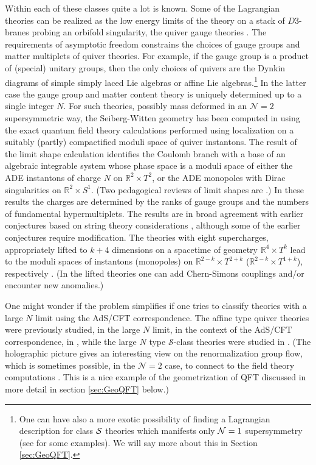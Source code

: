 \documentclass[12pt]{article}
\newcommand\BR{\mathbb{R}}
\newcommand\CalN{\mathcal{N}}
\newcommand\CalS{\mathcal{S}}
\begin{document}
Within each of these classes quite a lot is known. 
Some of the Lagrangian theories can be realized as the low energy limits of the theory on a stack of $D3$-branes probing an orbifold singularity, the quiver gauge theories \cite{Douglas:1996sw}. The requirements of asymptotic freedom constrains the choices of gauge groups
and matter multiplets of quiver theories. For example, if the gauge group is a product of (special) unitary groups, then the only choices
of quivers are the Dynkin diagrams of simple simply laced Lie algebras or affine Lie algebras.\footnote{ One can have also a more exotic possibility of finding a Lagrangian description for class ${\cal S}$ theories which manifests only ${\cal N}=1$ supersymmetry (see \cite{Maruyoshi:2016aim,Razamat:2019vfd,Zafrir:2019hps} for some examples). We will say more about this in Section \ref{sec:GeoQFT}. } In the latter case the gauge group and matter content theory is uniquely determined up to a single integer $N$. For such theories, possibly mass deformed in an ${\CalN}=2$ supersymmetric way, the Seiberg-Witten geometry has been computed in \cite{Nekrasov:2012xe} using the exact quantum field theory calculations
performed using localization on a suitably (partly) compactified moduli space of quiver instantons. The result of the limit shape calculation
identifies the Coulomb branch with a base of an algebraic integrable system whose phase space is a moduli space of either the ADE instantons of charge $N$
on ${\BR}^{2} \times T^{2}$, or the ADE monopoles with Dirac singularities on ${\BR}^{2} \times S^{1}$.
(Two pedagogical reviews of limit shapes are \cite{KenyonLimitShape,OkounkovLimitShapes}.)
In these results the charges are determined by the ranks of gauge groups and the numbers of fundamental hypermultiplets. The results are in broad  agreement with   earlier
conjectures based on string theory considerations \cite{Katz:1997eq,Cherkis:2000ft,Friedman:1997yq}, although some of the earlier conjectures require modification. The theories with eight supercharges, appropriately lifted to $k+4$ dimensions 
on a spacetime of geometry ${\BR}^{4} \times T^{k}$
lead to the moduli spaces of instantons (monopoles) on ${\BR}^{2-k} \times T^{2+k}$ (${\BR}^{2-k} \times T^{1+k}$), respectively \cite{Nekrasov:2012xe}. (In the lifted theories one can add Chern-Simons couplings and/or encounter new anomalies.) 

One might wonder if the problem simplifies if one tries to classify theories with a 
large $N$ limit using the AdS/CFT correspondence. 
 The affine type quiver theories were previously studied, in the large $N$ limit, in the context of the AdS/CFT correspondence, 
in \cite{Kachru:1998ys,Lawrence:1998ja}, 
while the large $N$ type $\CalS$-class theories were studied in \cite{Gaiotto:2009gz}. (The holographic picture gives an interesting
view on the renormalization group flow, which is sometimes possible, in the $\CalN=2$ case, to connect to the field theory computations \cite{NikitaKlebanov:2000}. This is a nice example of the geometrization of QFT discussed in more detail in section \ref{sec:GeoQFT} below.) 
\end{document}

